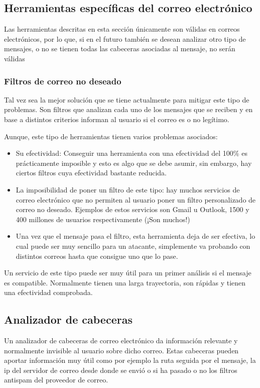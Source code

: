 \subsection{Herramientas específicas del correo electrónico}
Las herramientas descritas en esta sección únicamente son válidas en correos electrónicos, por lo que, si en el futuro también se desean analizar otro tipo de mensajes, o no se tienen todas las cabeceras asociadas al mensaje, no serán válidas

\subsubsection{Filtros de correo no deseado}
Tal vez sea la mejor solución que se tiene actualmente para mitigar este tipo de problemas. Son filtros que analizan cada uno de los mensajes que se reciben y en base a distintos criterios informan al usuario si el correo es o no legítimo.

Aunque, este tipo de herramientas tienen varios problemas asociados:

\begin{itemize}
    \item Su efectividad: Conseguir una herramienta con una efectividad del 100\% es prácticamente imposible y esto es algo que se debe asumir, sin embargo, hay ciertos filtros cuya efectividad bastante reducida.
    \item La imposibilidad de poner un filtro de este tipo: hay muchos servicios de correo electrónico que no permiten al usuario poner un filtro personalizado de correo no deseado. Ejemplos de estos servicios son Gmail u Outlook,  1500 \cite{usuarios_gmail} y 400 \cite{usuarios_hotmail} millones de usuarios respectivamente (¡Son muchos!)
    \item Una vez que el mensaje pasa el filtro, esta herramienta deja de ser efectiva, lo cual puede ser muy sencillo para un atacante, simplemente va probando con distintos correos hasta que consigue uno que lo pase. 
\end{itemize}

Un servicio de este tipo puede ser muy útil para un primer análisis si el mensaje es compatible. Normalmente tienen una larga trayectoria, son rápidas y tienen una efectividad comprobada.

\subsection{Analizador de cabeceras}
Un analizador de cabeceras de correo electrónico da información relevante y normalmente invisible al usuario sobre dicho correo. Estas cabeceras pueden aportar información muy útil como por ejemplo la ruta seguida por el mensaje, la ip del servidor de correo desde donde se envió o si ha pasado o no los filtros antispam del proveedor de correo. 

